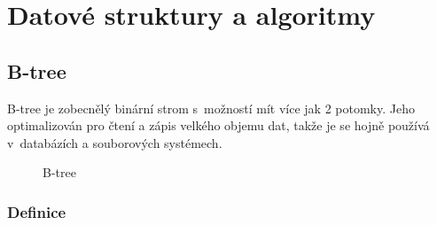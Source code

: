 \chapter{Datové struktury a algoritmy}


\section{B-tree}

B-tree\cite{Cormen:2001:IA:580470} je zobecnělý binární strom s~možností
mít více jak 2 potomky. Jeho optimalizován pro čtení a zápis velkého
objemu dat, takže je se hojně používá v~databázích a souborových
systémech.

\begin{figure}[t]
\centering{}\caption{B-tree}
\end{figure}



\subsection{Definice}


